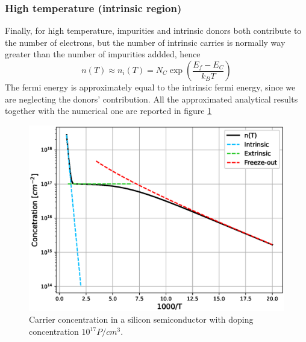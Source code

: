 \documentclass{article}
\begin{document}
\subsubsection*{High temperature (intrinsic region)}
Finally, for high temperature, impurities and intrinsic donors both contribute to the number of electrons, but the number of intrinsic carries is normally way greater than 
the number of impurities addded, hence 
\begin{equation*}
    n(T) \approx n_i(T) = N_C \exp\left(\frac{E_f-E_C}{k_BT}\right)
\end{equation*}
The fermi energy is approximately equal to the intrinsic fermi energy, since we are neglecting the donors' contribution.
\vspace{10pt}
All the approximated analytical results together with the numerical one are reported in figure \ref{fig:concentration}

\begin{figure}[h]
    \centering
    \includegraphics[scale=0.6]{concentration.eps}
    \caption{Carrier concentration in a silicon semiconductor with doping concentration $10^{17} P/cm^3$.}
    \label{fig:concentration}
\end{figure}
\end{document}
